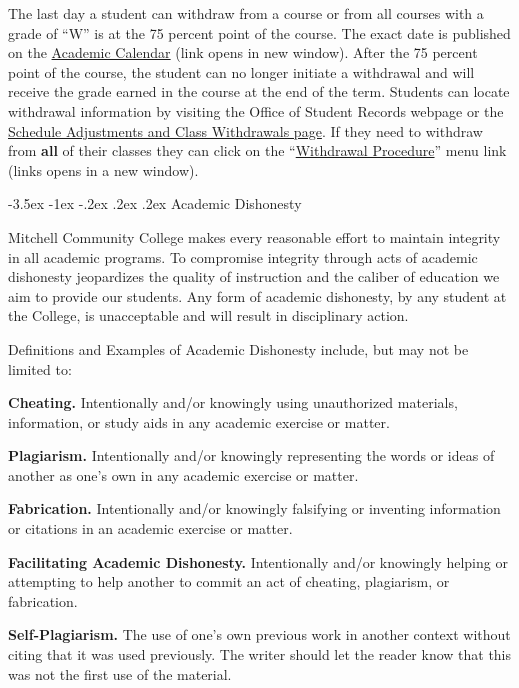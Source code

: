 \documentclass[11pt]{article}
\makeatletter
\renewcommand\section{\@startsection{section}{1}{0pt}%
  {-3.5ex \@plus -1ex \@minus -.2ex}%
  {.2ex \@plus.2ex}%
  {\normalfont\Large\bfseries}} %
\makeatother
\begin{document}
The last day a student can withdraw from a course or from all courses with a grade of ``W'' is at the 75 percent point of the course. The exact date is published on the \href{https://www.mitchellcc.edu/wp-content/uploads/2024/05/2024-2025-Academic-Calendar.pdf}{Academic Calendar} (link opens in new window). After the 75 percent point of the course, the student can no longer initiate a withdrawal and will receive the grade earned in the course at the end of the term. Students can locate withdrawal information by visiting the Office of Student Records webpage or the \href{https://www.mitchellcc.edu/schedule-adjustments-and-class-withdrawals/}{Schedule Adjustments and Class Withdrawals page}. If they need to withdraw from \textbf{all} of their classes they can click on the ``\href{https://mitchellcc.edu/withdrawal-procedure}{Withdrawal Procedure}'' menu link (links opens in a new window).

\section{Academic Dishonesty}

Mitchell Community College makes every reasonable effort to maintain integrity in all academic programs. To compromise integrity through acts of academic dishonesty jeopardizes the quality of instruction and the caliber of education we aim to provide our students.  Any form of academic dishonesty, by any student at the College, is unacceptable and will result in disciplinary action.

Definitions and Examples of Academic Dishonesty include, but may not be limited to:

\textbf{Cheating.} Intentionally and/or knowingly using unauthorized materials, information, or study aids in any academic exercise or matter.

\textbf{Plagiarism.} Intentionally and/or knowingly representing the words or ideas of another as one's own in any academic exercise or matter.

\textbf{Fabrication.} Intentionally and/or knowingly falsifying or inventing information or citations in an academic exercise or matter.

\textbf{Facilitating Academic Dishonesty.} Intentionally and/or knowingly helping or attempting to help another to commit an act of cheating, plagiarism, or fabrication.

\textbf{Self-Plagiarism.} The use of one's own previous work in another context without citing that it was used previously. The writer should let the reader know that this was not the first use of the material.
\end{document}
